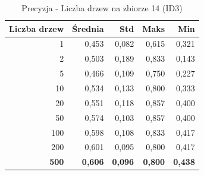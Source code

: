 \begin{table}[htbp]
\centering
\small
\setlength{\tabcolsep}{6pt}
\renewcommand{\arraystretch}{1.2}
\caption{Precyzja - Liczba drzew na zbiorze 14 (ID3)}
\label{tab:ID3_tree_count_14_precision}
\begin{tabular}{r|r|r|r|r}
\toprule
Liczba drzew & Średnia & Std & Maks & Min \\
\hline
1 & 0,453 & 0,082 & 0,615 & 0,321 \\
2 & 0,503 & 0,189 & 0,833 & 0,143 \\
5 & 0,466 & 0,109 & 0,750 & 0,227 \\
10 & 0,534 & 0,133 & 0,800 & 0,333 \\
20 & 0,551 & 0,118 & 0,857 & 0,400 \\
50 & 0,574 & 0,103 & 0,857 & 0,400 \\
100 & 0,598 & 0,108 & 0,833 & 0,417 \\
200 & 0,601 & 0,095 & 0,800 & 0,417 \\
\textbf{500} & \textbf{0,606} & \textbf{0,096} & \textbf{0,800} & \textbf{0,438} \\
\bottomrule
\end{tabular}
\end{table}